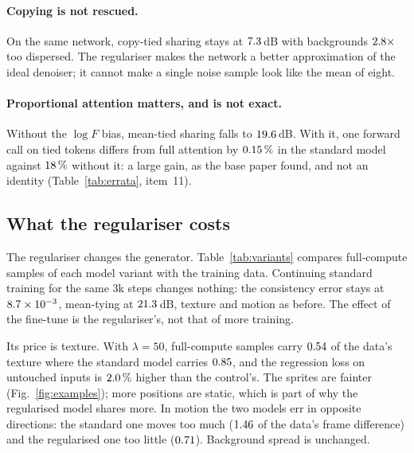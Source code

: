 \paragraph{Copying is not rescued.}
On the same network, copy-tied sharing stays at $7.3$\,dB with backgrounds $2.8\times$ too dispersed.
The regulariser makes the network a better approximation of the ideal denoiser; it cannot make a single noise sample look like the mean of eight.

\paragraph{Proportional attention matters, and is not exact.}
Without the $\log F$ bias, mean-tied sharing falls to $19.6$\,dB.
With it, one forward call on tied tokens differs from full attention by $0.15\,\%$ in the standard model against $18\,\%$ without it: a large gain, as the base paper found, and not an identity (Table~\ref{tab:errata}, item~11).

\subsection{What the regulariser costs}

The regulariser changes the generator.
Table~\ref{tab:variants} compares full-compute samples of each model variant with the training data.
Continuing standard training for the same 3k steps changes nothing: the consistency error stays at $8.7\times10^{-3}$, mean-tying at $21.3$\,dB, texture and motion as before.
The effect of the fine-tune is the regulariser's, not that of more training.

Its price is texture.
With $\lambda=50$, full-compute samples carry $0.54$ of the data's texture where the standard model carries $0.85$, and the regression loss on untouched inputs is $2.0\,\%$ higher than the control's.
The sprites are fainter (Fig.~\ref{fig:examples}); more positions are static, which is part of why the regularised model shares more.
In motion the two models err in opposite directions: the standard one moves too much ($1.46$ of the data's frame difference) and the regularised one too little ($0.71$).
Background spread is unchanged.

